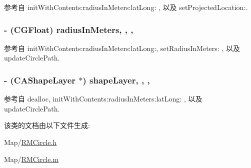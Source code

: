 参考自 init\-With\-Contents\-:radius\-In\-Meters\-:lat\-Long\-: , 以及 set\-Projected\-Location\-:.

\hypertarget{interface_r_m_circle_a9b20cc4c242976d1e4dec2439c31fc51}{
\subsubsection[{radius\-In\-Meters}]{\setlength{\rightskip}{0pt plus 5cm}-\/ (C\-G\-Float) radius\-In\-Meters\hspace{0.3cm}{\ttfamily [read]}, {\ttfamily [write]}, {\ttfamily [nonatomic]}, {\ttfamily [assign]}}}\label{interface_r_m_circle_a9b20cc4c242976d1e4dec2439c31fc51}


参考自 init\-With\-Contents\-:radius\-In\-Meters\-:lat\-Long\-:, set\-Radius\-In\-Meters\-: , 以及 update\-Circle\-Path.

\hypertarget{interface_r_m_circle_a7d1ee226bef3b061c4ca301957d91382}{
\subsubsection[{shape\-Layer}]{\setlength{\rightskip}{0pt plus 5cm}-\/ (C\-A\-Shape\-Layer $\ast$) shape\-Layer\hspace{0.3cm}{\ttfamily [read]}, {\ttfamily [write]}, {\ttfamily [nonatomic]}, {\ttfamily [retain]}}}\label{interface_r_m_circle_a7d1ee226bef3b061c4ca301957d91382}


参考自 dealloc, init\-With\-Contents\-:radius\-In\-Meters\-:lat\-Long\-: , 以及 update\-Circle\-Path.



该类的文档由以下文件生成\-:\begin{DoxyCompactItemize}
\item 
Map/\hyperlink{_r_m_circle_8h}{R\-M\-Circle.\-h}\item 
Map/\hyperlink{_r_m_circle_8m}{R\-M\-Circle.\-m}\end{DoxyCompactItemize}
